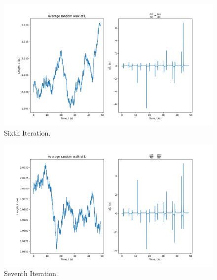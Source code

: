\documentclass[10pt, twocolumn]{article}
\begin{document}
\begin{figure}
    \centering
    \includegraphics[width = \columnwidth]{Projects/ForcedSimplePendulum/Plots/simplified m = 1.0, L0= 2.0, k = 1000, g = 9.81, F = 20, sigma = 1e-10, run number 5.png}
    \caption{Sixth Iteration.}
    \label{fig:enter-label}
\end{figure}

\begin{figure}
    \centering
    \includegraphics[width = \columnwidth]{Projects/ForcedSimplePendulum/Plots/simplified m = 1.0, L0= 2.0, k = 1000, g = 9.81, F = 20, sigma = 1e-10, run number 6.png}
    \caption{Seventh Iteration.}
    \label{fig:enter-label}
\end{figure}
\end{document}
